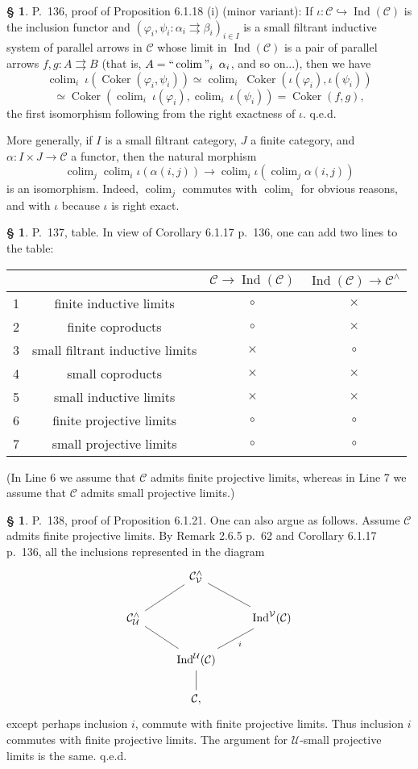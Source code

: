 \documentclass[12pt]{article}
\theoremstyle{remark}
\theoremstyle{definition}
\newtheorem{s}[thm]{\S}
\newcommand{\C}{\mathcal C}
\newcommand{\U}{\mathcal U}
\newcommand{\V}{\mathcal V}
\newcommand{\parar}{\rightrightarrows}\newcommand{\paralelarrows}{\rightrightarrows}%
\newcommand{\mv}{ (minor variant)}
\DeclareMathOperator*{\coli}{colim}
\DeclareMathOperator*{\co}{colim}
\DeclareMathOperator*{\ic}{``\coli"}
\DeclareMathOperator{\Coker}{Coker}
\DeclareMathOperator{\Ind}{Ind}
\begin{document}
%
%
\begin{s} 
P.~136, proof of Proposition 6.1.18 (i)\mv: If $\iota:\C\hookrightarrow\Ind(\C)$ is the inclusion functor and $(\varphi_i,\psi_i:\alpha_i\parar\beta_i)_{i\in I}$ is a small filtrant inductive system of parallel arrows in $\C$ whose limit in $\Ind(\C)$ is a pair of parallel arrows $f,g:A\parar B$ (that is, $A=\ic_i\ \alpha_i$, and so on...), then we have 
$$
\co_i\ \iota(\Coker(\varphi_i,\psi_i))\simeq
\co_i\ \Coker(\iota(\varphi_i),\iota(\psi_i))
$$
$$
\simeq
\Coker(\co_i\ \iota(\varphi_i),\co_i\ \iota(\psi_i))=
\Coker(f,g),
$$ 
the first isomorphism following from the right exactness of $\iota$. q.e.d.

More generally, if $I$ is a small filtrant category, $J$ a finite category, and $\alpha:I\times J\to\C$ a functor, then the natural morphism 
$$
\co_j\co_i\iota(\alpha(i,j))\to\co_i\iota\left(\co_j\alpha(i,j)\right) 
$$ 
is an isomorphism. Indeed, $\co_j$ commutes with $\co_i$ for obvious reasons, and with $\iota$ because $\iota$ is right exact.
\end{s}
%
%
\begin{s} 
P.~137, table. In view of Corollary 6.1.17 p.~136, one can add two lines to the table:\bigskip 

\begin{center}
\begin{tabular}{|c|c|c|c|}\hline
&&$\C\to\Ind(\C)$&$\Ind(\C)\to\C^\wedge$\\ \hline
1&finite inductive limits&$\circ$&$\times$\\ \hline
2&finite coproducts&$\circ$&$\times$\\ \hline
3&small filtrant inductive limits&$\times$&$\circ$\\ \hline
4&small coproducts&$\times$&$\times$\\ \hline
5&small inductive limits&$\times$&$\times$\\ \hline
6&finite projective limits&$\circ$&$\circ$\\ \hline
7&small projective limits&$\circ$&$\circ$\\ \hline
\end{tabular}
\end{center}%
\noindent(In Line 6 we assume that $\C$ admits finite projective limits, whereas in Line 7 we assume that $\C$ admits small projective limits.)%
\end{s}
%
%
\begin{s} 
P.~138, proof of Proposition 6.1.21. One can also argue as follows. Assume $\C$ admits finite projective limits. By Remark 2.6.5 p.~62 and Corollary 6.1.17 p.~136, all the inclusions represented in the diagram 
\[
\begin{tikzcd}
{}&\C^\wedge_\V\ar[-]{ld}\ar[-]{rd}\\
\C^\wedge_\U\ar[-]{rd}&&\Ind^\V(\C)\ar[-]{ld}{i}\\
&\Ind^\U(\C)\ar[-]{d}\\
&\C,
\end{tikzcd}
\]
except perhaps inclusion $i$, commute with finite projective limits. Thus inclusion $i$ commutes with finite projective limits. The argument for $\U$-small projective limits is the same. q.e.d.
\end{s}
\end{document}
